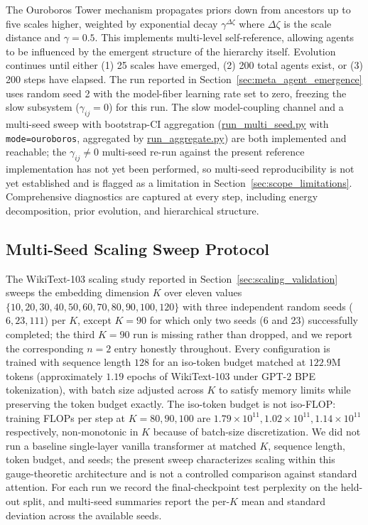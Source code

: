 \documentclass[11pt]{article}
\begin{document}
The Ouroboros Tower mechanism propagates priors down from ancestors up to five scales higher, weighted by exponential decay $\gamma^{\Delta\zeta}$ where $\Delta\zeta$ is the scale distance and $\gamma = 0.5$. This implements multi-level self-reference, allowing agents to be influenced by the emergent structure of the hierarchy itself. Evolution continues until either (1) 25 scales have emerged, (2) 200 total agents exist, or (3) 200 steps have elapsed. The run reported in Section~\ref{sec:meta_agent_emergence} uses random seed 2 with the model-fiber learning rate set to zero, freezing the slow subsystem ($\gamma_{ij} = 0$) for this run. The slow model-coupling channel and a multi-seed sweep with bootstrap-CI aggregation (\url{run_multi_seed.py} with \texttt{mode=\textquotesingle ouroboros\textquotesingle}, aggregated by \url{run_aggregate.py}) are both implemented and reachable; the $\gamma_{ij} \neq 0$ multi-seed re-run against the present reference implementation has not yet been performed, so multi-seed reproducibility is not yet established and is flagged as a limitation in Section~\ref{sec:scope_limitations}. Comprehensive diagnostics are captured at every step, including energy decomposition, prior evolution, and hierarchical structure.

\subsection{Multi-Seed Scaling Sweep Protocol}
\label{sec:methods_scaling}

The WikiText-103 scaling study reported in Section~\ref{sec:scaling_validation} sweeps the embedding dimension $K$ over eleven values $\{10, 20, 30, 40, 50, 60, 70, 80, 90, 100, 120\}$ with three independent random seeds ($6, 23, 111$) per $K$, except $K = 90$ for which only two seeds (6 and 23) successfully completed; the third $K = 90$ run is missing rather than dropped, and we report the corresponding $n = 2$ entry honestly throughout. Every configuration is trained with sequence length $128$ for an iso-token budget matched at $122.9$M tokens (approximately $1.19$ epochs of WikiText-103 under GPT-2 BPE tokenization), with batch size adjusted across $K$ to satisfy memory limits while preserving the token budget exactly. The iso-token budget is not iso-FLOP: training FLOPs per step at $K = 80, 90, 100$ are $1.79\times 10^{11}, 1.02\times 10^{11}, 1.14\times 10^{11}$ respectively, non-monotonic in $K$ because of batch-size discretization. We did not run a baseline single-layer vanilla transformer at matched $K$, sequence length, token budget, and seeds; the present sweep characterizes scaling within this gauge-theoretic architecture and is not a controlled comparison against standard attention. For each run we record the final-checkpoint test perplexity on the held-out split, and multi-seed summaries report the per-$K$ mean and standard deviation across the available seeds.
\end{document}
